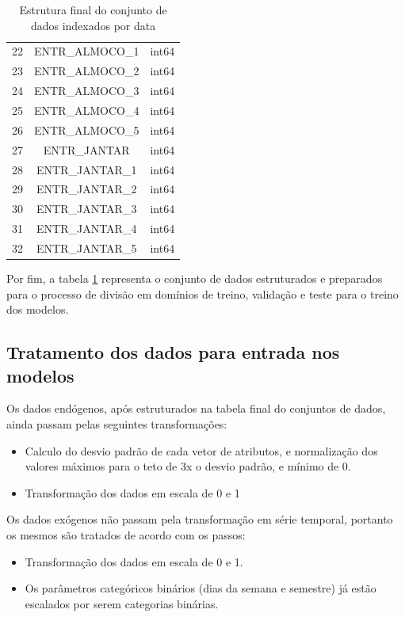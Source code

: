 \documentclass[	12pt, Times, openright, twoside, a4paper, english, brazil]{abntex2}
\begin{document}
\begin{table}[!ht]
\begin{tabular}{|c|c|c|}
                22&	ENTR\_ALMOCO\_1				&int64 \\
                23&	ENTR\_ALMOCO\_2				&int64 \\
                24&	ENTR\_ALMOCO\_3				&int64 \\ 
                25&	ENTR\_ALMOCO\_4				&int64 \\
                26&	ENTR\_ALMOCO\_5				&int64 \\
                27&	ENTR\_JANTAR				&	int64 \\ 
                28&	ENTR\_JANTAR\_1				&int64\\
                29&	ENTR\_JANTAR\_2				&int64 \\ 
                30&	ENTR\_JANTAR\_3				&int64 \\ 
                31&	ENTR\_JANTAR\_4				&int64 \\
                32&	ENTR\_JANTAR\_5				&int64\\
              \hline
            \end{tabular}
            \caption{Estrutura final do conjunto de dados indexados por data}
            \label{table:dataset_final}
        \end{table}
        Por fim, a tabela \ref{table:dataset_final} representa o conjunto de dados estruturados e preparados para o processo de divisão em domínios de treino, validação e teste para o treino dos modelos.
        
        \subsection{Tratamento dos dados para entrada nos modelos}
         	Os dados endógenos, após estruturados na tabela final do conjuntos de dados, ainda passam pelas seguintes transformações:
         	\begin{itemize}
                \item	Calculo do desvio padrão de cada vetor de atributos, e normalização dos valores máximos para o teto de 3x o desvio padrão, e mínimo de 0. 
                \item	Transformação dos dados em escala de 0 e 1
            \end{itemize}
            Os dados exógenos não passam pela transformação em série temporal, portanto os mesmos são tratados de acordo com os passos:
            \begin{itemize}
                \item	Transformação dos dados em escala de 0 e 1.
                \item	Os parâmetros categóricos binários (dias da semana e semestre) já estão escalados por serem categorias binárias.
            \end{itemize}
\end{document}

